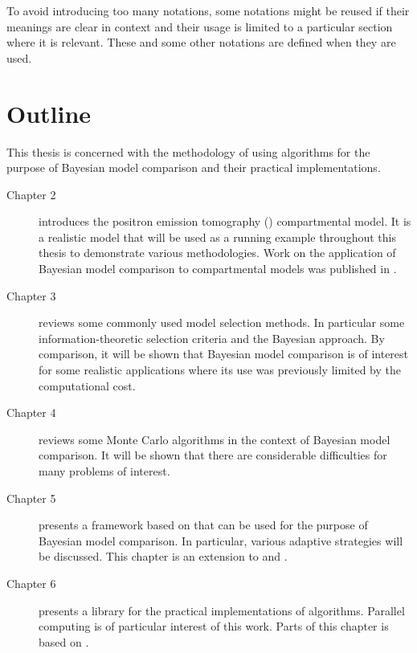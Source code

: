 To avoid introducing too many notations, some notations might be reused if
their meanings are clear in context and their usage is limited to a
particular section where it is relevant. These and some other notations are
defined when they are used.

\section{Outline}
\label{sec:Outline}

This thesis is concerned with the methodology of using \smc algorithms for the
purpose of Bayesian model comparison and their practical implementations.
\begin{description}
  \item[Chapter 2] introduces the positron emission tomography (\pet)
  compartmental model. It is a realistic model that will be used as a running
  example throughout this thesis to demonstrate various methodologies. Work
  on the application of Bayesian model comparison to \pet compartmental
  models was published in \cite{Zhou2013}.
  \item[Chapter 3] reviews some commonly used model selection methods. In
  particular some information-theoretic selection criteria and the Bayesian
  approach. By comparison, it will be shown that Bayesian model comparison is
  of interest for some realistic applications where its use was previously
  limited by the computational cost.
  \item[Chapter 4] reviews some Monte Carlo algorithms in the context of
  Bayesian model comparison. It will be shown that there are considerable
  difficulties for many problems of interest.
  \item[Chapter 5] presents a framework based on \smc that can be used for
  the purpose of Bayesian model comparison. In particular, various adaptive
  strategies will be discussed. This chapter is an extension to
  \cite{Zhou:2013vx} and \cite{Zhou:2012uz}.  
  \item[Chapter 6] presents a \cpp library for the practical implementations
  of \smc algorithms. Parallel computing is of particular interest of this
  work. Parts of this chapter is based on \cite{vsmcjss}.
\end{description}
